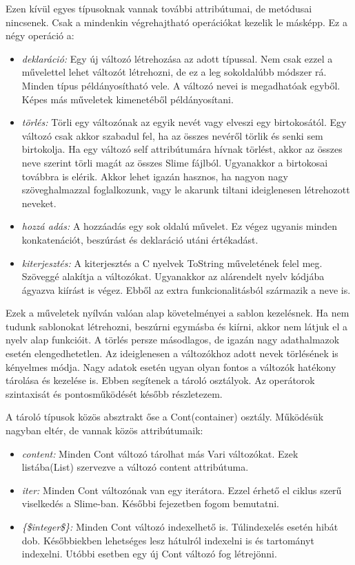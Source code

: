 Ezen kívül egyes típusoknak vannak további attribútumai, de metódusai nincsenek. 
Csak a mindenkin végrehajtható operációkat kezelik le másképp. 
Ez a négy operáció a:
\begin{itemize}
\item \emph{deklaráció:} 
Egy új változó létrehozása az adott típussal.
Nem csak ezzel a művelettel lehet változót létrehozni, de ez a leg sokoldalúbb módszer rá.
Minden típus példányosítható vele.
A változó nevei is megadhatóak egyből.
Képes más műveletek kimenetéből példányosítani.
\item \emph{törlés:} 
Törli egy változónak az egyik nevét vagy elveszi egy birtokosától.
Egy változó csak akkor szabadul fel, ha az összes nevéről törlik és senki sem birtokolja.
Ha egy változó self attribútumára hívnak törlést, akkor az összes neve szerint törli magát az összes Slime fájlból.
Ugyanakkor a birtokosai továbbra is elérik.
Akkor lehet igazán hasznos, ha nagyon nagy szöveghalmazzal foglalkozunk, vagy le akarunk tiltani ideiglenesen létrehozott neveket.
\item \emph{hozzá adás:}
A hozzáadás egy sok oldalú művelet. 
Ez végez ugyanis minden konkatenációt, beszúrást és deklaráció utáni értékadást.
\item \emph{kiterjesztés:}
A kiterjesztés a C nyelvek ToString műveletének felel meg. 
Szöveggé alakítja a változókat.
Ugyanakkor az alárendelt nyelv kódjába ágyazva kiírást is végez.
Ebből az extra funkcionalitásból származik a neve is.
\end{itemize}

Ezek a műveletek nyílván valóan alap követelményei a sablon kezelésnek. 
Ha nem tudunk sablonokat létrehozni, beszúrni egymásba és kiírni, akkor nem látjuk el a nyelv alap funkcióit.
A törlés persze másodlagos, de igazán nagy adathalmazok esetén elengedhetetlen.
Az ideiglenesen a változókhoz adott nevek törlésének is kényelmes módja.
Nagy adatok esetén ugyan olyan fontos a változók hatékony tárolása és kezelése is.
Ebben segítenek a tároló osztályok.
Az operátorok szintaxisát és pontosműködését később részletezem. 

A tároló típusok közös absztrakt őse a Cont(container) osztály.
Működésük nagyban eltér, de vannak közös attribútumaik:
\begin{itemize}
\item \emph{content:} 
Minden Cont változó tárolhat más Vari változókat.
Ezek listába(List) szervezve a változó content attribútuma.
\item \emph{iter:} 
Minden Cont változónak van egy iterátora.
Ezzel érhető el ciklus szerű viselkedés a Slime-ban.
Későbbi fejezetben fogom bemutatni.
\item \emph{\{\$integer\$\}:} 
Minden Cont változó indexelhető is.
Túlindexelés esetén hibát dob.
Későbbiekben lehetséges lesz hátulról indexelni is és tartományt indexelni.
Utóbbi esetben egy új Cont változó fog létrejönni.
\end{itemize}

